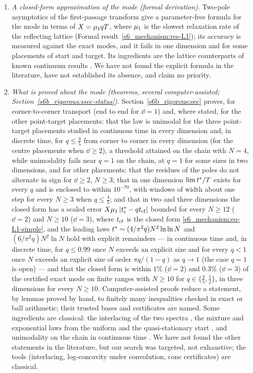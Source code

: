 \begin{enumerate}
\item \emph{A closed-form approximation of the mode (formal derivation).} Two-pole asymptotics of the first-passage
transform give a parameter-free formula for the mode in terms of $X=\mu_{1} qT$, where $\mu_{1}$ is the slowest
relaxation rate of the reflecting lattice (Formal result~\ref{s6_mechanism:res-L1}); its accuracy is measured
against the exact modes, and it fails in one dimension and for some placements of start and target. Its
ingredients are the lattice counterparts of known continuum results \citep{WardKeller1993,IsaacsonNewby2013}. We
have not found the explicit formula in the literature, have not established its absence, and claim no priority.

\item \emph{What is proved about the mode (theorems, several computer-assisted;
Section~\ref{s6b_rigorous:ssec-status}).} Section~\ref{s6b_rigorous:sec} proves, for corner-to-corner transport (end to
end for $\dd=1$) and, where stated, for the other point-target placements: that the law is unimodal for the three
point-target placements studied in continuous time in every dimension and, in discrete time, for $q\le\frac45$ from
corner to corner in every dimension (for the centre placements when $\dd\ge2$), a threshold attained on the chain with
$N=4$, while unimodality fails near $q=1$ on the chain, at $q=1$ for some sizes in two dimensions, and for other
placements; that the residues of the poles do not alternate in sign for $\dd\ge2$, $N\ge3$; that in
one dimension $\lim t^{*}/T$ exists for every
$q$ and is enclosed to within $10^{-70}$, with windows of width about one step for every $N\ge3$ when $q\le\frac45$;
and that in two and three dimensions the closed form has a scaled error $X\mu_{1}\,|t^{*}_{\mathrm{c}}-qt_{\mathrm{cf}}|$ bounded for every
$N\ge12$ ($\dd=2$) and $N\ge10$ ($\dd=3$), where $t_{\mathrm{cf}}$ is the closed form \eqref{s6_mechanism:eq-L1-simple}, and
the leading laws $t^{*}\sim(4/\pi^{2}q)N^{2}\ln\ln N$ and $(6/\pi^{2}q)N^{2}\ln N$ hold with explicit remainders ---
in continuous time and, in discrete time, for $q\le0.99$ once $N$ exceeds an explicit size and for every $q<1$ once $N$ exceeds an explicit size of order $\pi q/(1-q)$ as $q\to1$ (the case $q=1$ is
open) --- and that the closed form is within $1\%$ ($\dd=2$) and $0.3\%$ ($\dd=3$) of the certified exact mode on
finite ranges with $N\ge10$ for $q\in\{\frac45,\frac12\}$, in three dimensions for every $N\ge10$.
Computer-assisted proofs reduce a statement, by lemmas proved by hand, to finitely many inequalities checked in exact
or ball arithmetic; their trusted bases and certificates are named. Some ingredients are classical: the interlacing of
the two spectra \citep{HartichGodec2018,HartichGodec2019}, the mixture and exponential laws from the uniform and the
quasi-stationary start \citep{AldousFill}, and unimodality on the chain in continuous time \citep{Keilson1971}. We have not
found the other statements in the literature, but our search was targeted, not exhaustive; the tools (interlacing,
log-concavity under convolution, cone certificates) are classical.


\end{enumerate}
